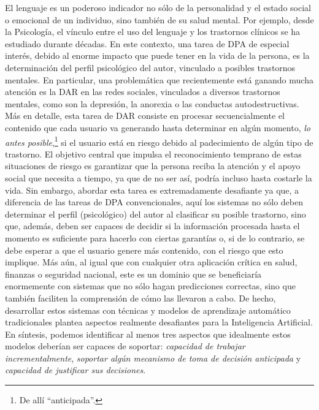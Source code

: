 El lenguaje es un poderoso indicador no sólo de la personalidad y el estado social o emocional de un individuo, sino también de su salud mental. Por ejemplo, desde la Psicología, el vínculo entre el uso del lenguaje y los trastornos clínicos se ha estudiado durante décadas\cite{pennebaker2003psychological}.
En este contexto, una tarea de \ac{DPA} de especial interés, debido al enorme impacto que puede tener en la vida de la persona, es la determinación del perfil psicológico del autor, vinculado a posibles trastornos mentales.
En particular, una problemática que recientemente está ganando mucha atención es la \ac{DAR} en las redes sociales, vinculados a diversos trastornos mentales, como son la depresión, la anorexia o las conductas autodestructivas\cite{losada2016test,losada2017erisk,losada2018overview,losadaetal2019}. %
Más en detalle, esta tarea de \ac{DAR} consiste en procesar secuencialmente el contenido que cada usuario va generando hasta determinar en algún momento, \emph{lo antes posible},\footnote{De allí  ``anticipada''.} si el usuario está en riesgo debido al padecimiento de algún tipo de trastorno. El objetivo central que impulsa el reconocimiento temprano de estas situaciones de riesgo es garantizar que la persona reciba la atención y el apoyo social que necesita a tiempo, ya que de no ser así, podría incluso hasta costarle la vida.
Sin embargo, abordar esta tarea es extremadamente desafiante ya que, a diferencia de las tareas de \ac{DPA} convencionales, aquí los sistemas no sólo deben determinar el perfil (psicológico) del autor al clasificar su posible trastorno, sino que, además, deben ser capaces de decidir si la información procesada hasta el momento es suficiente para hacerlo con ciertas garantías o, si de lo contrario, se debe esperar a que el usuario genere más contenido, con el riesgo que esto implique.
Más aún, al igual que con cualquier otra aplicación crítica en salud, finanzas o seguridad nacional, este es un dominio que se beneficiaría enormemente con sistemas que no sólo hagan predicciones correctas, sino que también faciliten la comprensión de cómo las llevaron a cabo.
De hecho, desarrollar estos sistemas con técnicas y modelos de aprendizaje automático tradicionales plantea aspectos realmente desafiantes para la Inteligencia Artificial.
En síntesis, podemos identificar al menos tres aspectos que idealmente estos modelos deberían ser capaces de soportar: \emph{capacidad de trabajar incrementalmente}, \emph{soportar algún mecanismo de toma de decisión anticipada} y \emph{capacidad de justificar sus decisiones}.

